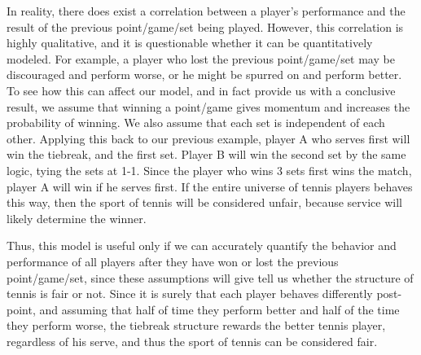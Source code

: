 \documentclass[12pt]{article}
\begin{document}
In reality, there does exist a correlation between a player’s performance and the result of the previous point/game/set being played. However, this correlation is highly qualitative, and it is questionable whether it can be quantitatively modeled. For example, a player who lost the previous point/game/set may be discouraged and perform worse, or he might be spurred on and perform better. To see how this can affect our model, and in fact provide us with a conclusive result, we assume that winning a point/game gives momentum and increases the probability of winning. We also assume that each set is independent of each other. Applying this back to our previous example, player A who serves first will win the tiebreak, and the first set. Player B will win the second set by the same logic, tying the sets at 1-1. Since the player who wins 3 sets first wins the match, player A will win if he serves first. If the entire universe of tennis players behaves this way, then the sport of tennis will be considered unfair, because service will likely determine the winner. 

Thus, this model is useful only if we can accurately quantify the behavior and performance of all players after they have won or lost the previous point/game/set, since these assumptions will give tell us whether the structure of tennis is fair or not. Since it is surely that each player behaves differently post-point, and assuming that half of time they perform better and half of the time they perform worse, the tiebreak structure rewards the better tennis player, regardless of his serve, and thus the sport of tennis can be considered fair. 
\end{document}
